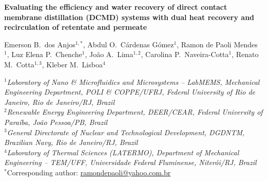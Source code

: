 \documentclass[14pt,letterpaper,fleqn]{extarticle}
\begin{document}
\begin{center}
  {\Large\bfseries Evaluating the efficiency and water recovery of direct contact
  membrane distillation (DCMD) systems with dual heat recovery and
  recirculation of retentate and permeate}

  \vspace{1em}

  Emerson B.\ dos Anjos$^{1,*}$,
  Abdul O.\ Cárdenas Gómez$^{1}$,
  Ramon de Paoli Mendes $^{1}$,
  Luz Elena P.\ Chenche$^{1}$,
  João A.\ Lima$^{1,2}$,
  Carolina P.\ Naveira-Cotta$^{1}$,
  Renato M.\ Cotta$^{1,3}$,
  Kleber M.\ Lisboa$^{4}$

  \vspace{0.8em}

  \small
  $^{1}$\textit{Laboratory of Nano \& Microfluidics and Microsystems -- LabMEMS,
    Mechanical Engineering Department, POLI \& COPPE/UFRJ,
    Federal University of Rio de Janeiro, Rio de Janeiro/RJ, Brazil}\\[0.3em]
  $^{2}$\textit{Renewable Energy Engineering Department, DEER/CEAR,
    Federal University of Paraíba, João Pessoa/PB, Brazil}\\[0.3em]
  $^{3}$\textit{General Directorate of Nuclear and Technological Development,
    DGDNTM, Brazilian Navy, Rio de Janeiro/RJ, Brazil}\\[0.3em]
  $^{4}$\textit{Laboratory of Thermal Sciences (LATERMO),
    Department of Mechanical Engineering -- TEM/UFF,
    Universidade Federal Fluminense, Niterói/RJ, Brazil}\\[0.5em]
  $^{*}$Corresponding author: \href{mailto:ramondepaoli@yahoo.com.br}{ramondepaoli@yahoo.com.br}
\end{center}
\end{document}
